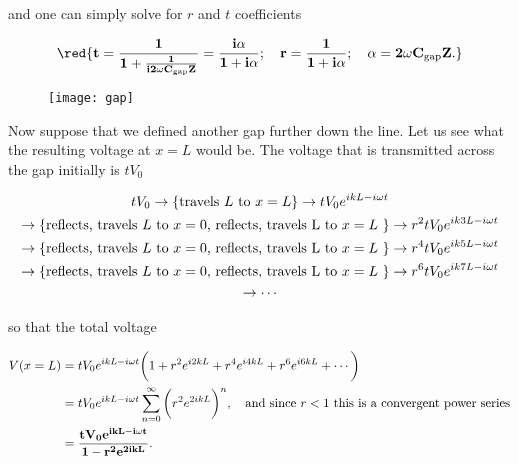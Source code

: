  \noindent and one can simply solve for $ r $ and $ t $ coefficients

 \begin{equation}\label{tLinert}
   \mathbf{\red{t= \frac{1}{1+\frac{1}{i2\omega C_\text{gap}Z}} = \frac{i\alpha}{1+i\alpha};\quad	 r = \frac{1}{1+i\alpha};\quad \alpha = 2\omega C_\text{gap}Z.}}
 \end{equation}

 \begin{figure}
   \centering%
   \texttt{[image: gap]}
 \end{figure}

 Now suppose that  we defined another gap further down  the line. Let
 us see what the  resulting voltage at $ x=L $  would be. The voltage
 that is transmitted across the gap initially is $ tV_0 $

 \begin{multline}\label{tlineMUltiple}
   tV_0 \rightarrow \left\lbrace \text{travels $ L $ to
       $    x=L    $}\right\rbrace    \rightarrow   tV_0e^{ikL-i\omega    t}    \\
   \rightarrow\left\lbrace \text{reflects, travels $ L  $ to $ x=0 $,
       reflects,  travels  L  to $  x=L  $  }\right\rbrace\rightarrow
   r^2tV_0e^{ik3L-i\omega         t}\\        \rightarrow\left\lbrace
     \text{reflects, travels $ L $ to $ x=0 $, reflects, travels L to
       $ x=L $
     }\right\rbrace\rightarrow     r^4tV_0e^{ik5L-i\omega      t}     \\
   \rightarrow\left\lbrace \text{reflects, travels $ L  $ to $ x=0 $,
       reflects,  travels  L  to $  x=L  $  }\right\rbrace\rightarrow
   r^6tV_0e^{ik7L-i\omega t} \\ \rightarrow\cdots
 \end{multline}

 \noindent so that the total voltage

 \begin{equation}\label{tlineTotalVoltage}
   \begin{aligned}
     V(x=L) & = tV_0e^{ikL-i\omega t}\bigg(1+r^2e^{i2kL}+r^4e^{i4kL}+r^6e^{i6kL}+\cdots\bigg)\\
     & = tV_0e^{ikL-i\omega t}\sum_{n=0}^{\infty}\bigg(r^2e^{2ikL}\bigg)^n, \quad\text{and since $ r<1 $ this is a convergent power series}\\
     & = \mathbf{\frac{tV_0e^{ikL-i\omega t}}{1-r^2e^{2ikL}}.}
   \end{aligned}
 \end{equation}

